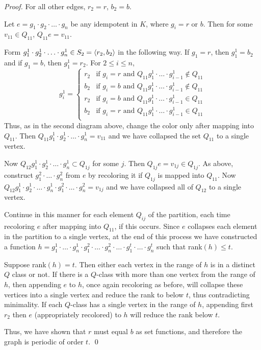 \begin{proof}
\bigskip
\noindent
For all other edges, $r_2=r$, $b_2=b$.

Let $e = g_1 \cdot g_2 \cdot \ldots \cdot g_n$ be any idempotent in $K$, where $g_i = r$ or $b$.
Then for some $v_{11} \in Q_{11}$, $Q_{11} e = v_{11}$.

Form $g^1_1 \cdot g^1_2 \cdot \ldots \cdot g^1_n \in S_2 = \langle r_2,b_2 \rangle$ in the following way.
If $g_1 = r$, then $g^1_1 = b_2$ and if $g_1 = b$, then $g^1_1 = r_2$.
For $2 \le i \le n$,
\[
  g^1_i = \begin{cases}
	r_2 &\text{if } g_i = r \text{ and } Q_{11} g^1_1 
		\cdot \ldots \cdot g^1_{i-1} \not\in Q_{11}  \\
	b_2 &\text{if } g_i = b \text{ and } Q_{11} g^1_1 
		\cdot \ldots \cdot g^1_{i-1} \not\in Q_{11}  \\
	r_2 &\text{if } g_i = b \text{ and } Q_{11} g^1_1 
		\cdot \ldots \cdot g^1_{i-1} \in Q_{11}  \\
	b_2 &\text{if } g_i = r \text{ and } Q_{11} g^1_1 
		\cdot \ldots \cdot g^1_{i-1} \in Q_{11}  \\
  \end{cases}
\]
Thus, as in the second diagram above, change the color only after mapping into $Q_{11}$.
Then $Q_{11} g^1_1 \cdot g^1_2 \cdot \ldots \cdot g^1_n = v_{11}$ and we have collapsed the set $Q_{11}$ to a single vertex.

Now $Q_{12} g^1_1 \cdot g^1_2 \cdot \ldots \cdot g^1_n \subset Q_{1j}$ for some $j$.
Then $Q_{1j} e = v_{1j} \in Q_{1j}$.
As above, construct $g^2_1 \cdot \ldots \cdot g^2_n$ from $e$ by recoloring it if $Q_{1j}$ is mapped into $Q_{11}$.
Now $Q_{12} g^1_1 \cdot g^1_2 \cdot \ldots \cdot g^1_n \cdot g^2_1 \cdot \ldots \cdot g^2_n = v_{1j}$ and we have collapsed all of $Q_{12}$ to a single vertex.

Continue in this manner for each element $Q_{ij}$ of the partition, each time recoloring $e$ after mapping into $Q_{11}$, if this occurs.
Since $e$ collapses each element in the partition to a single vertex, at the end of this process we have constructed a function $h = g^1_1 \cdot \ldots \cdot g^1_n \cdot g^2_1 \cdot \ldots \cdot g^2_n \cdot \ldots \cdot g^t_1 \cdot \ldots \cdot g^t_n$ such that rank$(h) \le t$.

Suppose rank$(h) = t$.  
Then either each vertex in the range of $h$ is in a distinct $Q$ class or not.  
If there is a $Q$-class with more than one vertex from the range of $h$, then appending $e$ to $h$, once again recoloring as before, will collapse these vertices into a single vertex and reduce the rank to below $t$, thus contradicting minimality.  
If each $Q$-class has a single vertex in the range of $h$, appending first $r_2$ then $e$ (appropriately recolored) to $h$ will reduce the rank below $t$.

Thus, we have shown that $r$ must equal $b$ as set functions, and therefore the graph is periodic of order $t$.
\qed
\end{proof}
